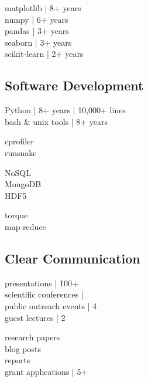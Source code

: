 \documentclass[]{winter-resume-openfont}
\begin{document}
\begin{minipage}[t]{0.29\textwidth}
\textbullet{} matplotlib | 8+ years \\ 
\textbullet{} numpy | 6+ years \\ 
\textbullet{} pandas | 3+ years \\ 
\textbullet{} seaborn | 3+ years \\
\textbullet{} scikit-learn | 2+ years \\
\sectionsep
\sectionsep

\subsection{Software Development}
\sectionsep

\textbullet{} Python | 8+ years | 10,000+ lines\\
\textbullet{}  bash \& unix tools | 8+ years \\
 \sectionsep

\textbullet{} cprofiler \\ 
\textbullet{} runsnake \\ 
\sectionsep

\textbullet{} NoSQL \\  
\textbullet{} MongoDB \\
\textbullet{} HDF5 \\ 
\sectionsep

\textbullet{} torque \\
\textbullet{} map-reduce \\
\sectionsep

\sectionsep

\subsection{Clear Communication}
\sectionsep

\textbullet{} presentations | 100+  \\
\textbullet{} scientific conferences | \\
\textbullet{} public outreach events | 4 \\
\textbullet{} guest lectures | 2\\
\sectionsep

\textbullet{} research papers \\
\textbullet{} blog posts \\ 
\textbullet{} reports \\
\textbullet{} grant applications | 5+ \\


\end{minipage}
\end{document}
